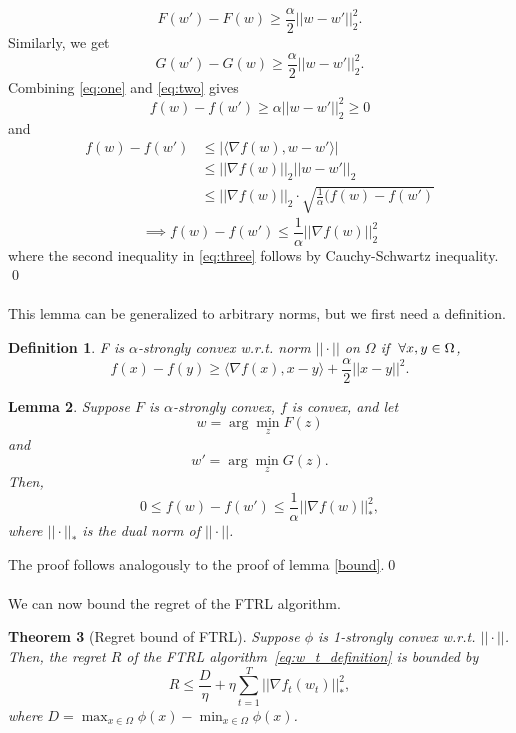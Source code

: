 \documentclass[11pt]{article}
\newtheorem{theorem}{Theorem}
\newtheorem{definition}[theorem]{Definition}
\newtheorem{lemma}[theorem]{Lemma}
\begin{document}
\begin{equation}
    \label{eq:one}
F(w')-F(w) \geq \frac{\alpha}{2}||w-w'||_2^2.
\end{equation}
Similarly, we get 
\begin{equation}
\label{eq:two}
G(w')-G(w) \geq \frac{\alpha}{2}||w-w'||_2^2.
\end{equation}
Combining \eqref{eq:one} and \eqref{eq:two} gives 
\begin{equation}
    f(w) - f(w') \geq \alpha ||w-w'||_2^2 \geq 0
\end{equation}
and 
\begin{equation}\label{eq:three}
\begin{split}
    f(w) - f(w') & \leq |\langle \nabla f(w),w-w'\rangle |\\
    & \leq ||\nabla f(w)||_2 ||w-w'||_2\\
    & \leq ||\nabla f(w)||_2 \cdot \sqrt{\frac{1}{\alpha}(f(w)-f(w')}
\end{split}
\end{equation}
$$\implies f(w)-f(w') \leq \frac{1}{\alpha}||\nabla f(w)||_2^2$$
where the second inequality in \eqref{eq:three} follows by Cauchy-Schwartz inequality. \qed \\\\
This lemma can be generalized to arbitrary norms, but we first need a definition. 
\begin{definition}
F is $\alpha$-strongly convex w.r.t. norm $||\cdot ||$ on $\Omega$ if $\hspace{1mm} \forall x,y \in \Omega$, 
$$f(x) - f(y) \geq \langle \nabla f(x), x-y \rangle + \frac{\alpha}{2}||x-y||^2.$$
\end{definition}
\begin{lemma}
\label{lemma:general_norm}
Suppose $F$ is $\alpha$-strongly convex, $f$ is convex, and let 
$$w = \arg \min_z F(z)$$
and 
$$w' = \arg \min_z G(z).$$
Then, $$0 \leq f(w) - f(w') \leq \frac{1}{\alpha}||\nabla f(w)||_*^2,$$
where $||\cdot ||_*$ is the dual norm of $||\cdot ||$.
\end{lemma}
\proof The proof follows analogously to the proof of lemma \ref{bound}.\qed \\\\
We can now bound the regret of the FTRL algorithm.
\begin{theorem}[Regret bound of FTRL]
Suppose $\phi$ is 1-strongly convex w.r.t. $||\cdot ||$. Then, the
regret $R$ of the FTRL algorithm~\eqref{eq:w_t_definition} is bounded by 
\begin{equation*}
    R \leq \frac{D}{\eta} + \eta \sum_{t=1}^T ||\nabla f_t(w_t)||^2_*,
\end{equation*}
where $D = \max_{x \in \Omega} \phi(x) - \min_{x\in \Omega} \phi (x)$.
\end{theorem}
\end{document}
